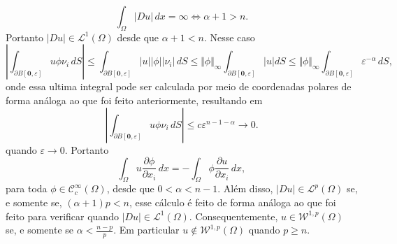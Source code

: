 \documentclass[a4paper, 11pt]{book}
\theoremstyle{definition}
\newcommand{\cC}{\mathcal{C}}
\newcommand{\cL}{\mathcal{L}}
\newcommand{\cW}{\mathcal{W}}
\begin{document}
\begin{ex}
    \[
        \int_\Omega |Du| \, dx = \infty \iff \alpha + 1 > n.
    \]
    Portanto $|Du| \in \cL^1(\Omega)$ desde que $\alpha + 1 < n$.
    Nesse caso
    \[
        \left| \int_{\partial B[\mathbf{0},\varepsilon]} u \phi \nu_i \,dS \right| \leqslant 
        \int_{\partial B[\mathbf{0},\varepsilon]} |u| |\phi| |\nu_i| \,dS \leqslant \Vert \phi \Vert_{\infty}\int_{\partial B[\mathbf{0},\varepsilon]} |u|dS \leqslant \Vert \phi \Vert_{\infty}\int_{\partial B[\mathbf{0},\varepsilon]} \varepsilon^{-\alpha} \,dS,
    \]
    onde essa ultima integral pode ser calculada por meio de coordenadas polares de forma análoga ao que foi feito anteriormente, resultando em
    \[
        \left| \int_{\partial B[\mathbf{0},\varepsilon]} u \phi \nu_i \,dS \right| \leqslant c \varepsilon^{n-1-\alpha} \to 0.
    \]
    quando $\varepsilon \to 0$. Portanto
    \[
        \int_{\Omega} u \dfrac{\partial \phi}{\partial x_i} \, dx = -\int_{\Omega} \phi \dfrac{\partial u}{\partial x_i} \,dx,
    \]
    para toda $\phi \in \cC^\infty_c(\Omega)$, desde que $0 < \alpha < n-1$. 
    Além disso, $|Du| \in \cL^p(\Omega)$ se, e somente se, $(\alpha + 1)p < n$, esse cálculo é feito de forma análoga ao que foi feito para verificar quando $|Du| \in \cL^1(\Omega)$. Consequentemente, $u \in \cW^{1,p}(\Omega)$ se, e somente se $\alpha < \frac{n-p}{p}$.
    Em particular $u \not\in \cW^{1,p}(\Omega)$ quando $p \geqslant n$.
\end{ex}
\end{document}

